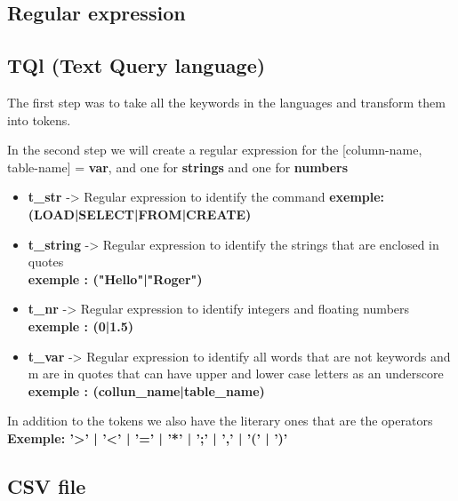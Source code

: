 \documentclass{article}
\begin{document}
\vspace{0.5cm}
\clearpage

\Large

\begin{center}
\section{Regular expression}
\end{center}

\subsection{TQl (Text Query language)} 
\textbf{}

\setlength{\parindent}{10ex} 
The first step was to take all the keywords in the languages and transform them into tokens.\par 
In the second step we will create a regular expression for the [column-name, table-name] = \textbf{var}, and one for \textbf{strings} and one for \textbf{numbers}
\begin{itemize}
\item \textbf{t\_str} -> Regular expression to identify the command \textbf{exemple: (LOAD|SELECT|FROM|CREATE)}
\item \textbf{t\_string } -> Regular expression to identify the strings that are enclosed in quotes  \\ \textbf{exemple : ("Hello"|"Roger")}
\item \textbf{t\_nr } -> Regular expression to identify integers and floating numbers  \\ \textbf{exemple : (0|1.5)}
\item \textbf{t\_var } ->  Regular expression to identify all words that are not keywords and m are in quotes that can have upper and lower case letters as an underscore \\ \textbf{exemple : (collun\_name|table\_name)}
\end{itemize}

\vspace{1.5CM}
\setlength{\parindent}{10ex} 
In addition to the tokens we also have the literary ones that are the operators
\textbf{Exemple: '>' | '<' | '=' | '*' | ';' | ',' | '(' |  ')' }


\vspace{1.5CM}

\subsection{CSV file} 
\textbf{}
	
\end{document}
